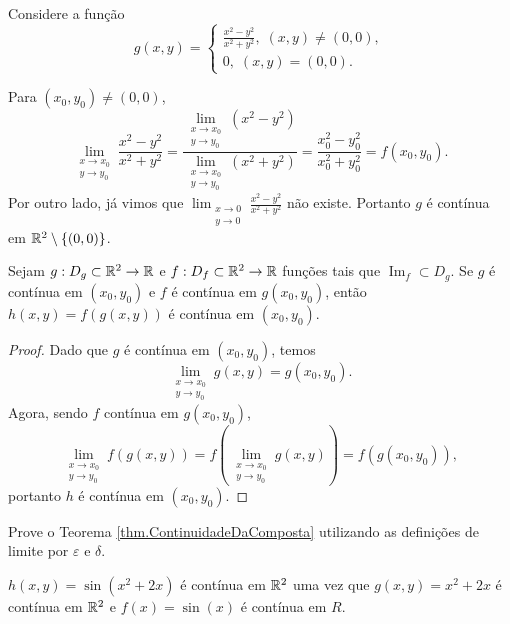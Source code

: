 \begin{example}
    Considere a função \[g(x,y) = \begin{cases}
        \frac{x^2 - y^2}{x^2 + y^2},\; (x,y)\neq(0,0), \\
        0,\; (x,y)=(0,0).
    \end{cases}\]

    Para \((x_0,y_0)\neq(0,0)\), \[\displaystyle\lim_{\substack{x\to x_0 \\ y\to y_0}} \frac{x^2 - y^2}{x^2 + y^2} = \frac{\displaystyle\lim_{\substack{x\to x_0 \\ y\to y_0}} (x^2 - y^2)}{\displaystyle\lim_{\substack{x\to x_0 \\ y\to y_0}} (x^2 + y^2)} = \frac{x_0^2 - y_0^2}{x_0^2 + y_0^2} = f(x_0,y_0). \] Por outro lado, já vimos que \(\displaystyle\lim_{\substack{x\to 0 \\ y\to 0}} \frac{x^2 - y^2}{x^2 + y^2} \) não existe. Portanto \(g\) é contínua em \(\mathbb{R}^2\setminus\{(0,0)\}\).
\end{example}

\begin{theorem}\label{thm.ContinuidadeDaComposta}
    Sejam \(g:D_g \subset \mathbb{R}^2 \to \mathbb{R}\) e \(f:D_f\subset\mathbb{R}^2 \to \mathbb{R}\) funções tais que \(\operatorname{Im}_f \subset D_g\). Se \(g\) é contínua em \((x_0,y_0)\) e \(f\) é contínua em \(g(x_0,y_0)\), então \(h(x,y) = f(g(x,y))\) é contínua em \((x_0,y_0)\).
\end{theorem}

\begin{proof}
    Dado que \(g\) é contínua em \((x_0,y_0)\), temos \[\displaystyle\lim_{\substack{x\to x_0 \\ y\to y_0}} g(x,y) = g(x_0,y_0).\] Agora, sendo \(f\) contínua em \(g(x_0,y_0)\), \[ \displaystyle\lim_{\substack{x\to x_0 \\ y\to y_0}} f(g(x,y)) = f\left( \displaystyle\lim_{\substack{x\to x_0 \\ y\to y_0}} g(x,y) \right) = f(g(x_0,y_0)),\] portanto \(h\) é contínua em \((x_0,y_0)\).
\end{proof}

\begin{exercise}
    Prove o Teorema \ref{thm.ContinuidadeDaComposta} utilizando as definições de limite por \(\varepsilon\) e \(\delta\).
\end{exercise}

\begin{example}
    \(h(x,y) = \sin(x^2 + 2x)\) é contínua em \(\mathbb{R}^2\) uma vez que \(g(x,y) = x^2 + 2x\) é contínua em \(\mathbb{R}^2\) e \(f(x) = \sin(x)\) é contínua em \(R\).
\end{example}

